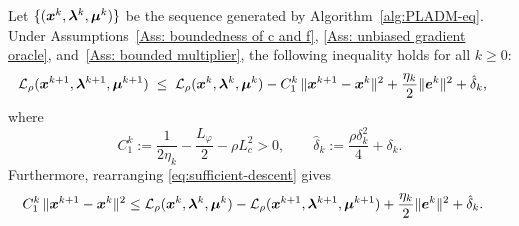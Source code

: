 \documentclass[10pt]{article}
\begin{document}




%
\begin{lemma}
\label{lem:sufficient-descent}
Let $\{(\bm{x}^k, \bm{\lambda}^k, \bm{\mu}^k)\}$ be the sequence generated by
Algorithm~\ref{alg:PLADM-eq}. Under
Assumptions~\ref{Ass: boundedness of c and f},
\ref{Ass: unbiased gradient oracle}, and~\ref{Ass: bounded multiplier}, the following inequality holds for all $k \ge 0$:
\begin{align}
  \mathcal{L}_{\rho}(\bm{x}^{k+1}, \bm{\lambda}^{k+1}, \bm{\mu}^{k+1})
  &\;\le\;
  \mathcal{L}_{\rho}(\bm{x}^k, \bm{\lambda}^k, \bm{\mu}^k)
  - C_1^k\,\|\bm{x}^{k+1}-\bm{x}^k\|^2
  + \frac{\eta_k}{2}\|\bm{e}^k\|^2
  + \hat\delta_k,
  \label{eq:sufficient-descent}
\end{align}
where
\begin{equation}\label{eq:C1-deltahat-def}
  C_1^k := \frac{1}{2\eta_k} - \frac{L_\varphi}{2} - \rho L_c^2 > 0,
  \qquad
  \hat\delta_k := \frac{\rho\delta_k^2}{4} + \delta_k.
\end{equation}
Furthermore, rearranging \eqref{eq:sufficient-descent} gives
\begin{align}\label{eq:descent-rearranged}
  C_1^k\,\|\bm{x}^{k+1}-\bm{x}^k\|^2
  \leq\;
  &\mathcal{L}_{\rho}(\bm{x}^k, \bm{\lambda}^k, \bm{\mu}^k)
  - \mathcal{L}_{\rho}(\bm{x}^{k+1}, \bm{\lambda}^{k+1}, \bm{\mu}^{k+1})
  + \frac{\eta_k}{2}\|\bm{e}^k\|^2
  + \hat\delta_k.
\end{align}
\end{lemma}
\end{document}
